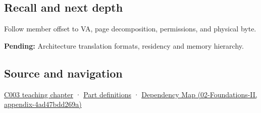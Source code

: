 \subsection{Recall and next depth}\label{recall-and-next-depth}

Follow member offset to VA, page decomposition, permissions, and physical byte.

\textbf{Pending:} Architecture translation formats, residency and memory hierarchy.

\subsection{Source and navigation}\label{source-and-navigation}

\href{Continuous\%20Notes/Computing\%20Foundations\%20-\%20From\%20Bits\%20to\%20C++\%20and\%20Systems\%20APIs\#Where\%20the\%20bytes\%20live}{C003 teaching chapter} · \hyperref[appendix-fd090d982a15]{Part definitions} · \href{}{Dependency Map (02-Foundations-II, appendix-4ad47bdd269a)}
